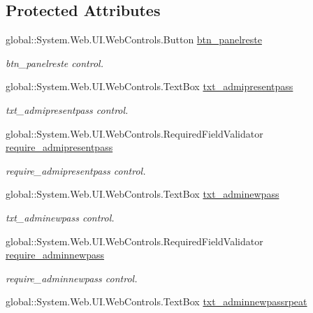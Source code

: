 \subsection*{Protected Attributes}
\begin{DoxyCompactItemize}
\item 
global\+::\+System.\+Web.\+U\+I.\+Web\+Controls.\+Button \mbox{\hyperlink{class_admin__resetpass_a7d8f4a489fd14f3452824dd42b0f500c}{btn\+\_\+panelreste}}
\begin{DoxyCompactList}\small\item\em btn\+\_\+panelreste control. \end{DoxyCompactList}\item 
global\+::\+System.\+Web.\+U\+I.\+Web\+Controls.\+Text\+Box \mbox{\hyperlink{class_admin__resetpass_a91f1eb852711d555c6744e52684aeb46}{txt\+\_\+admipresentpass}}
\begin{DoxyCompactList}\small\item\em txt\+\_\+admipresentpass control. \end{DoxyCompactList}\item 
global\+::\+System.\+Web.\+U\+I.\+Web\+Controls.\+Required\+Field\+Validator \mbox{\hyperlink{class_admin__resetpass_a54fde1892a9b940b8721aea7be15c9a0}{require\+\_\+admipresentpass}}
\begin{DoxyCompactList}\small\item\em require\+\_\+admipresentpass control. \end{DoxyCompactList}\item 
global\+::\+System.\+Web.\+U\+I.\+Web\+Controls.\+Text\+Box \mbox{\hyperlink{class_admin__resetpass_a9e52ae1d9342024a879798fe169f7f4d}{txt\+\_\+adminewpass}}
\begin{DoxyCompactList}\small\item\em txt\+\_\+adminewpass control. \end{DoxyCompactList}\item 
global\+::\+System.\+Web.\+U\+I.\+Web\+Controls.\+Required\+Field\+Validator \mbox{\hyperlink{class_admin__resetpass_a4fc09fc957d2a015058e79a5f95b089a}{require\+\_\+adminnewpass}}
\begin{DoxyCompactList}\small\item\em require\+\_\+adminnewpass control. \end{DoxyCompactList}\item 
global\+::\+System.\+Web.\+U\+I.\+Web\+Controls.\+Text\+Box \mbox{\hyperlink{class_admin__resetpass_a3b446dc3ec8e3c4c0847b1112a454e12}{txt\+\_\+adminnewpassrpeat}}

\end{DoxyCompactItemize}
